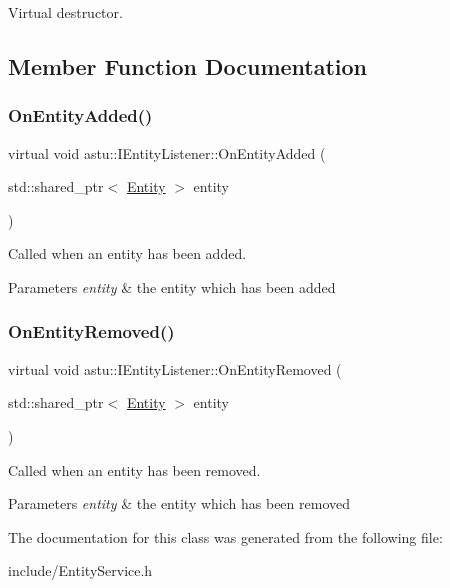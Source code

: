Virtual destructor. 

\subsection{Member Function Documentation}
\mbox{\label{classastu_1_1IEntityListener_a97132aa5a0f0e593c487127b32505447}} 
\subsubsection{\texorpdfstring{On\+Entity\+Added()}{OnEntityAdded()}}
{\footnotesize\ttfamily virtual void astu\+::\+I\+Entity\+Listener\+::\+On\+Entity\+Added (\begin{DoxyParamCaption}\item[{std\+::shared\+\_\+ptr$<$ \hyperlink{classastu_1_1Entity}{Entity} $>$}]{entity }\end{DoxyParamCaption})\hspace{0.3cm}{\ttfamily [pure virtual]}}

Called when an entity has been added.


\begin{DoxyParams}{Parameters}
{\em entity} & the entity which has been added \\
\hline
\end{DoxyParams}
\mbox{\label{classastu_1_1IEntityListener_a4fbd5c1a239a1c57c1567a630016074b}} 
\subsubsection{\texorpdfstring{On\+Entity\+Removed()}{OnEntityRemoved()}}
{\footnotesize\ttfamily virtual void astu\+::\+I\+Entity\+Listener\+::\+On\+Entity\+Removed (\begin{DoxyParamCaption}\item[{std\+::shared\+\_\+ptr$<$ \hyperlink{classastu_1_1Entity}{Entity} $>$}]{entity }\end{DoxyParamCaption})\hspace{0.3cm}{\ttfamily [pure virtual]}}

Called when an entity has been removed.


\begin{DoxyParams}{Parameters}
{\em entity} & the entity which has been removed \\
\hline
\end{DoxyParams}


The documentation for this class was generated from the following file\+:\begin{DoxyCompactItemize}
\item 
include/Entity\+Service.\+h\end{DoxyCompactItemize}
